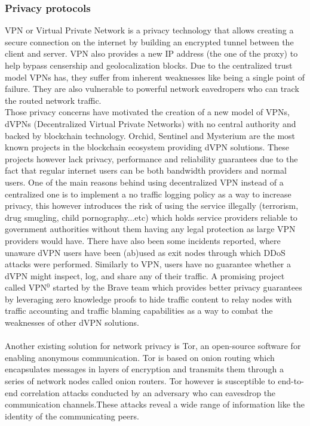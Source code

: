 \subsubsection{Privacy protocols}
VPN or Virtual Private Network is a privacy technology that allows creating a secure connection on the internet by building an encrypted tunnel between the client and server. VPN also provides a new IP address (the one of the proxy) to help bypass censership and geolocalization blocks.
Due to the centralized trust model VPNs has, they suffer from inherent weaknesses like being a single point of failure. They are also vulnerable to powerful network eavedropers who can track the routed network traffic.
\\Those privacy concerns have motivated the creation of a new model of VPNs, dVPNs (Decentralized Virtual Private Networks) with no central authority and backed by blockchain technology. Orchid, Sentinel and Mysterium are the most known projects in the blockchain ecosystem providing dVPN solutions. These projects however lack privacy, performance and reliability guarantees due to the fact that regular internet users can be both bandwidth providers and normal users. One of the main reasons behind using decentralized VPN instead of a centralized one is to implement a no traffic logging policy as a way to increase privacy, this however introduces the risk of using the service illegally (terrorism, drug smugling, child pornography...etc) which holds service providers reliable to government authorities without them having any legal protection as large VPN providers would have. There have also been some incidents reported, where unaware dVPN users have been (ab)used as exit nodes through which DDoS attacks were performed. Similarly to VPN, users have no guarantee whether a dVPN might inspect, log, and share any of their traffic. A promising project called VPN$^0$ started by the Brave team which provides better privacy guarantees by leveraging zero knowledge proofs to hide traffic content to relay nodes with traffic accounting and traffic blaming capabilities as a way to combat the weaknesses of other dVPN solutions.
\\~\\ Another existing solution for network privacy is Tor, an open-source software for enabling anonymous communication. Tor is based on onion routing which encapsulates messages in layers of encryption and transmits them through a series of network nodes called onion routers. Tor however is susceptible to end-to-end correlation attacks conducted by an adversary who can eavesdrop the communication channels.These attacks reveal a wide range of information like the identity of the communicating peers.
